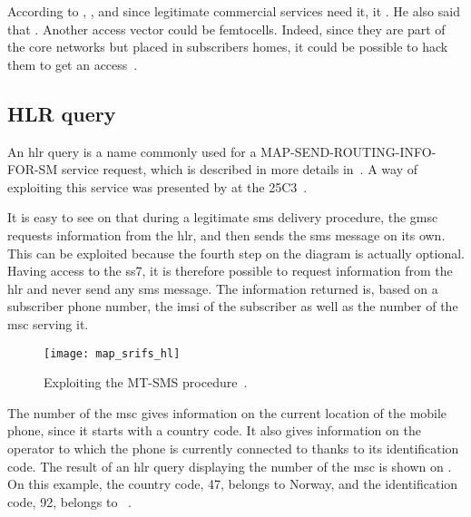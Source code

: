       According to , , and since legitimate commercial services
      need it, it . He also said that
      . Another access vector could be femtocells.
      Indeed, since they are part of the core networks but placed in
      subscribers homes, it could be possible to hack them to get an
      access~\cite{engel_ss7:_2014}.

    \subsection{HLR query}
    \label{sssection:hlr_query}

      An \gls{hlr} query is a name commonly used for a
      MAP-SEND-ROUTING-INFO-FOR-SM service request, which is described
      in more details in~. A way of exploiting this
      service was presented by  at the
      25C3~\cite{engel_locating_2008}.

      It is easy to see on  that during a
      legitimate \gls{sms} delivery procedure, the \gls{gmsc} requests
      information from the \gls{hlr}, and then sends the \gls{sms}
      message on its own. This can be exploited because the fourth step on
      the diagram is actually optional. Having access to the \gls{ss7},
      it is therefore possible to request information from the \gls{hlr}
      and never send any \gls{sms} message. The information returned is,
      based on a subscriber phone number, the \gls{imsi} of the
      subscriber as well as the number of the \gls{msc} serving it.

      \begin{figure}[h]
        \centering
        \texttt{[image: map\_srifs\_hl]}
        \caption{Exploiting the MT-SMS
      procedure~\cite[p.~792]{3gpp_ts_2015-2}.}
        \label{fig:map_srifs_hl}
      \end{figure}

      The number of the \gls{msc} gives information on the current
      location of the mobile phone, since it starts with a country code.
      It also gives information on the operator to which the phone is
      currently connected to thanks to its identification code. The
      result of an \gls{hlr} query displaying the number of the
      \gls{msc} is shown on . On this example, the
      country code, 47, belongs to Norway, and the identification code,
      92, belongs to ~\cite{nkom}.

